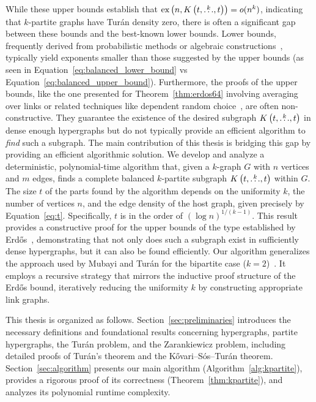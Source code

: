 While these upper bounds establish that $\text{ex} \left( n, K\left(t, \overset{k}{\dots}, t\right) \right) = o(n^k)$,
indicating that $k$-partite graphs have Turán density zero, there is often a significant gap between these bounds and the best-known lower bounds.
Lower bounds, frequently derived from probabilistic methods or algebraic constructions~\cite{kollar1996norm, brown1966graphs, conlon2020random},
typically yield exponents smaller than those suggested by the upper bounds
(as seen in Equation~\eqref{eq:balanced_lower_bound} vs Equation~\eqref{eq:balanced_upper_bound}).
Furthermore, the proofs of the upper bounds, like the one presented for Theorem~\ref{thm:erdos64}
involving averaging over links or related techniques like dependent random choice~\cite{fox2011dependent},
are often non-constructive.
They guarantee the existence of the desired subgraph $K\left(t, \overset{k}{\dots}, t\right)$ in dense enough hypergraphs but do not typically provide an efficient algorithm to \emph{find} such a subgraph.
The main contribution of this thesis is bridging this gap by providing an efficient algorithmic solution.
We develop and analyze a deterministic, polynomial-time algorithm that, given a $k$-graph $G$ with $n$ vertices and $m$ edges,
finds a complete balanced $k$-partite subgraph $K\left(t, \overset{k}{\dots}, t\right)$ within $G$.
The size $t$ of the parts found by the algorithm depends on the uniformity $k$, the number of vertices $n$, and the edge density of the host graph, given precisely by Equation~\eqref{eq:t}.
Specifically, $t$ is in the order of $(\log n)^{1/(k-1)}$.
This result provides a constructive proof for the upper bounds of the type established by Erdős~\cite{Erods1964},
demonstrating that not only does such a subgraph exist in sufficiently dense hypergraphs, but it can also be found efficiently.
Our algorithm generalizes the approach used by Mubayi and Turán for the bipartite case ($k=2$)~\cite{MUBAYI2010174}.
It employs a recursive strategy that mirrors the inductive proof structure of the Erdős bound,
iteratively reducing the uniformity $k$ by constructing appropriate link graphs.

This thesis is organized as follows.
Section~\ref{sec:preliminaries} introduces the necessary definitions and foundational results concerning hypergraphs, partite hypergraphs, the Turán problem, and the Zarankiewicz problem,
including detailed proofs of Turán's theorem and the Kővari--Sós--Turán theorem.
Section~\ref{sec:algorithm} presents our main algorithm (Algorithm~\ref{alg:kpartite}), provides a rigorous proof of its correctness (Theorem~\ref{thm:kpartite}),
and analyzes its polynomial runtime complexity.